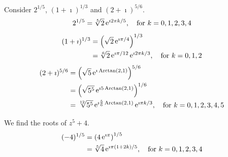 \begin{Example}
  Consider $2^{1/5}$, $(1 + \imath)^{1/3}$ and $(2 + \imath)^{5/6}$.
  \[
  2^{1/5} = \sqrt[5]{2} \mathop{\mathrm{e}}\nolimits^{\imath 2 \pi k / 5}, \quad \mathrm{for}\ k = 0,1,2,3,4
  \]
  \begin{align*}
    (1 + \imath)^{1/3}
    &= \left( \sqrt{2} \mathop{\mathrm{e}}\nolimits^{\imath \pi/4} \right)^{1/3} 
    \\
    &= \sqrt[6]{2} \mathop{\mathrm{e}}\nolimits^{\imath \pi / 12} \mathop{\mathrm{e}}\nolimits^{\imath 2 \pi k / 3}, \quad \mathrm{for}\ k = 0, 1, 2
  \end{align*}
  \begin{align*}
    (2 + \imath)^{5/6}
    &= \left( \sqrt{5} \mathop{\mathrm{e}}\nolimits^{\imath \mathop{\mathrm{Arctan}}\nolimits(2,1) } \right)^{5/6} 
    \\
    &= \left( \sqrt{5^5} \mathop{\mathrm{e}}\nolimits^{\imath 5 \mathop{\mathrm{Arctan}}\nolimits(2,1) } \right)^{1/6} 
    \\
    &= \sqrt[12]{5^5} \mathop{\mathrm{e}}\nolimits^{\imath \frac{5}{6} \mathop{\mathrm{Arctan}}\nolimits(2,1)}
    \mathop{\mathrm{e}}\nolimits^{\imath \pi k / 3}, \quad \mathrm{for}\ k = 0,1,2,3,4,5
  \end{align*}
\end{Example}





\begin{Example}
  We find the roots of $z^5 + 4$.
  \begin{align*}
    (- 4)^{1/5}
    &= \left( 4 \mathop{\mathrm{e}}\nolimits^{\imath \pi} \right)^{1/5} 
    \\
    &= \sqrt[5]{4} \mathop{\mathrm{e}}\nolimits^{\imath \pi (1 + 2 k) / 5}, \quad \mathrm{for}\ k = 0,1,2,3,4
  \end{align*}
\end{Example}













